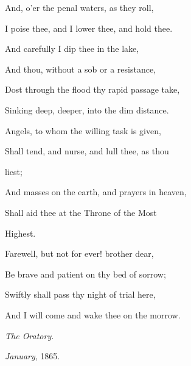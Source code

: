 And, o'er the penal waters, as they roll,

I poise thee, and I lower
thee, and hold thee.

And carefully I dip thee in the lake,

And thou, without a sob
or a resistance,

Dost through the flood thy rapid passage take,

Sinking deep, deeper,
into the dim distance. 

Angels, to whom the willing task is given,

Shall tend, and nurse,
and lull thee, as thou

liest;

And masses on the earth, and prayers in heaven,

Shall aid thee at the
Throne of the Most

Highest.

Farewell, but not for ever! brother dear,

Be brave and patient on
thy bed of sorrow;

Swiftly shall pass thy night of trial here,

And I will come and wake
thee on the morrow.

\emph{The Oratory}.

\emph{January}, 1865.
